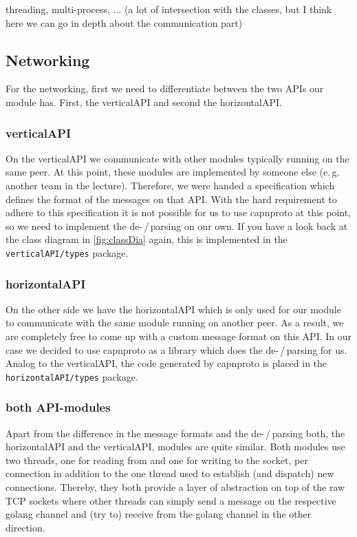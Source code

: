 \documentclass[a4paper,english,10pt,NET]{tumarticle}
\renewcommand{\eg}{\mbox{e.\,g.}\xspace} %
\begin{document}
% 	

threading, multi-process, ... (a lot of intersection with the classes, but I think here we can go in depth about the communication part)

\subsection{Networking} \label{sec:structureNetworking}

For the networking, first we need to differentiate between the two APIs our module has.
First, the verticalAPI and second the horizontalAPI.

\subsubsection{verticalAPI}
On the verticalAPI we communicate with other modules typically running on the same peer.
At this point, these modules are implemented by someone else (\eg another team in the lecture).
Therefore, we were handed a specification which defines the format of the messages on that API.
With the hard requirement to adhere to this specification it is not possible for us to use capnproto at this point, so we need to implement the de-\,/\,parsing on our own.
If you have a look back at the class diagram in \cref{fig:classDia} again, this is implemented in the \texttt{verticalAPI/types} package.

\subsubsection{horizontalAPI}
On the other side we have the horizontalAPI which is only used for our module to communicate with the same module running on another peer.
As a result, we are completely free to come up with a custom message format on this API.
In our case we decided to use capnproto as a library which does the de-\,/\,parsing for us.
Analog to the verticalAPI, the code generated by capnproto is placed in the \texttt{horizontalAPI/types} package.

\subsubsection{both API-modules}
Apart from the difference in the message formats and the de-\,/\,parsing both, the horizontalAPI and the verticalAPI, modules are quite similar.
Both modules use two threads, one for reading from and one for writing to the socket, per connection in addition to the one thread used to establish (and dispatch) new connections.
Thereby, they both provide a layer of abstraction on top of the raw TCP sockets where other threads can simply send a message on the respective golang channel and (try to) receive from the golang channel in the other direction.
\end{document}
